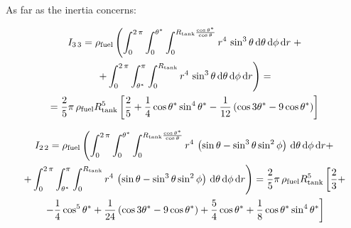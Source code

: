 As far as the inertia concerns:

\begin{multline}
	I_{3\,3} = \rho_{\text{fuel}} \left(\int_{0}^{2\,\pi}\int_{0}^{\theta^*}\int_{0}^{R_{\text{tank}}\frac{\cos{\theta^*}}{\cos{\theta}}} r^4\,\sin^3{\theta}\,\text{d}\theta\,\text{d}\phi\,\text{d}r  \vspace{3pt}\right.+\\
	\left.+ \int_{0}^{2\,\pi}\int_{\theta^*}^{\pi}\int_{0}^{R_{\text{tank}}} r^4\,\sin^3{\theta}\,\text{d}\theta\,\text{d}\phi\,\text{d}r\right)  =\\
	= \frac{2}{5}\pi\,\rho_{\text{fuel}}R^5_{\text{tank}}\left[\frac{2}{5}  + \frac{1}{4}\cos{\theta^*}\sin^4{\theta^*} -\frac{1}{12}\left(\cos{3\theta^*} - 9\cos{\theta^*}\right)\right]
\end{multline}

\begin{multline}
	I_{2\,2} =\rho_{\text{fuel}} \left(\int_{0}^{2\,\pi}\int_{0}^{\theta^*}\int_{0}^{R_{\text{tank}}\frac{\cos{\theta^*}}{\cos{\theta}}} r^4\,\left(\sin{\theta}-\sin^3{\theta}\sin^2{\phi}\right)\,\text{d}\theta\,\text{d}\phi\,\text{d}r + \vspace{3pt}\right.\\
	\left.+ \int_{0}^{2\,\pi}\int_{\theta^*}^{\pi}\int_{0}^{R_{\text{tank}}} r^4\,\left(\sin{\theta}-\sin^3{\theta}\sin^2{\phi}\right)\,\text{d}\theta\,\text{d}\phi\,\text{d}r\right) =
	\frac{2}{5}\pi\,\rho_{\text{fuel}}R^5_{\text{tank}}\left[\frac{2}{3} +\right.\\
	\left.- \frac{1}{4}\cos^5{\theta^*}  +\frac{1}{24}\left(\cos{3\theta^*} -9\cos{\theta^*}\right)  +\frac{5}{4}\cos{\theta^*} +\frac{1}{8} \cos{\theta^*}\sin^4{\theta^*}\right]
\end{multline}


